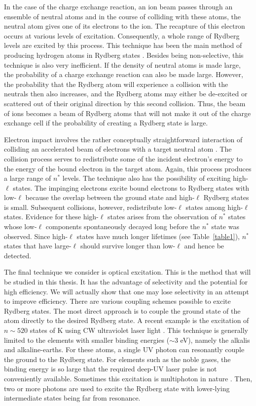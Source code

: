 In the case of the charge exchange reaction, an ion beam passes through an
ensemble of neutral atoms and in the course of colliding with these atoms, the
neutral atom gives one of its electrons to the ion.  The recapture of this
electron occurs at various levels of excitation.  Consequently, a whole range
of Rydberg levels are excited by this process.  This technique has been the
main method of producing hydrogen atoms in Rydberg states \cite{Bayfield:74}. 
Besides being non-selective, this technique is also very inefficient.  If the
density of neutral atoms is made large, the probability of a charge exchange
reaction can also be made large.  However, the probability that the Rydberg
atom will experience a collision with the neutrals then also increases, and the
Rydberg atoms may either be de-excited or scattered out of their original
direction by this second collision.  Thus, the beam of ions becomes a beam of
Rydberg atoms that will  not make it out of the charge exchange cell if the
probability of creating a Rydberg state is large.

Electron impact involves the rather conceptually straightforward interaction of
colliding an accelerated beam of electrons with a target neutral
atom \cite{Schiavone:79}.  The collision process serves to redistribute some of
the incident electron's energy to the energy of the bound electron in the target
atom.  Again, this process produces a large range of $n^*$ levels.  The
technique also has the possibility of exciting high-$\ell$ states.  The
impinging electrons excite bound electrons to Rydberg states with
low-$\ell$ because the overlap between the ground state and high-$\ell$
Rydberg states is small.  Subsequent collisions, however, redistribute
low-$\ell$ states among high-$\ell$ states.  Evidence for these high-$\ell$
states arises from the observation of $n^*$ states whose low-$\ell$ components
spontaneously decayed long before the $n^*$ state was observed.  Since
high-$\ell$ states have much longer lifetimes (see Table~\ref{table1}), $n^*$
states that have large-$\ell$ should survive longer than low-$\ell$ and hence be
detected.

The final technique we consider is optical excitation.  This is the method that
will be studied in this thesis.  It has the advantage of selectivity and the
potential for high efficiency.  We will actually show that one may lose
selectivity in an attempt to improve efficiency.  There are various coupling
schemes possible to excite Rydberg states.  The most direct approach is to
couple the ground state of the atom directly to the desired Rydberg state. A
recent example is the excitation of $n \sim 520$ states of K using CW
ultraviolet laser light \cite{Frey:96}.  This technique is generally limited
to the elements with smaller binding energies ($\sim 3$ eV), namely the alkalis
and alkaline-earths.  For these atoms, a single UV photon can resonantly couple
the ground to the Rydberg state.  For elements such as the noble gases, the
binding energy is so large that the required deep-UV laser pulse is not
conveniently available.  Sometimes this excitation is multiphoton in nature
\cite{Harper:77}.  Then, two or more photons are used to excite the Rydberg
state with lower-lying intermediate states being far from resonance.

